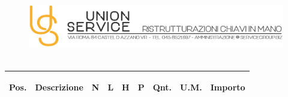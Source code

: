 \documentclass[a4paper]{article}
\begin{document}
                                \begin{figure}[!t]
                                \includegraphics[width=15.8cm, height=3cm]{intestazioneAlta2.jpg}
                                \end{figure}
                                
                                      \noindent\begin{tabular}{ | L{6.1mm} |  L{52.4mm} |  L{7mm} | L{7mm} | L{7mm} | L{7mm} | L{8mm} | L{8mm} | L{16mm} |   }
                                      \hline
                                \vspace{2.5mm}\begin{spacing}{0}\textbf{Pos.}\end{spacing} &\vspace{2.5mm}\begin{spacing}{0}\textbf{Descrizione}\end{spacing} &\vspace{2.5mm}\begin{spacing}{0}\textbf{N}\end{spacing} &\vspace{2.5mm}\begin{spacing}{0}\textbf{L}\end{spacing} &\vspace{2.5mm}\begin{spacing}{0}\textbf{H}\end{spacing} &\vspace{2.5mm}\begin{spacing}{0}\textbf{P}\end{spacing} &\vspace{2.5mm}\begin{spacing}{0}\textbf{Qnt.}\end{spacing} &\vspace{2.5mm}\begin{spacing}{0}\textbf{U.M.}\end{spacing} &\vspace{2.5mm}\begin{spacing}{0}\textbf{Importo}
                        \end{spacing} \\ \hline %


\end{tabular}
\end{document}

